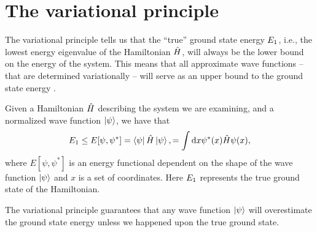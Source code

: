     \section{The variational principle}
        \label{sec:variational-principle}
        The variational principle tells us that the ``true'' ground state energy
        $E_1$, i.e., the lowest energy eigenvalue of the Hamiltonian
        $\hat{H}$, will always be the lower bound on the energy of the system.
        This means that all approximate wave functions -- that are determined
        variationally -- will serve as an upper bound to the ground state energy
        \cite{griffiths2017introduction}.
        \begin{theorem}
            Given a Hamiltonian $\hat{H}$ describing the system we are examining,
            and a normalized wave function $\ket{\psi}$, we have that
            \begin{align}
                E_1
                \leq
                E[\psi, \psi^{*}]
                = \bra{\psi}\hat{H}\ket{\psi},
                = \int\dd x\psi^{*}(x)\hat{H}\psi(x),
                \label{eq:variational-principle}
            \end{align}
            where $E[\psi, \psi^{*}]$ is an energy functional dependent on the shape of
            the wave function $\ket{\psi}$ and $x$ is a set of coordinates.
            Here $E_1$ represents the true ground state of the
            Hamiltonian.
        \end{theorem}
        The variational principle guarantees that any wave function $\ket{\psi}$
        will overestimate the ground state energy unless we happened upon the
        true ground state.
